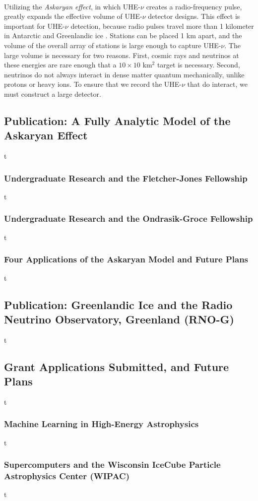 \documentclass[../../../main.tex]{subfiles}
\begin{document}
\\
\vspace{0.25cm}
Utilizing the \textit{Askaryan effect}, in which UHE-$\nu$ creates a radio-frequency pulse, greatly expands the effective volume of UHE-$\nu$ detector designs.  This effect is important for UHE-$\nu$ detection, because radio pulses travel more than 1 kilometer in Antarctic and Greenlandic ice \cite{10.3189/2015jog14j214} \cite{10.3189/2015jog15j057} \cite{10.1002/2015rs005849} \cite{10.1016/j.astropartphys.2011.11.010}.  Stations can be placed 1 km apart, and the volume of the overall array of stations is large enough to capture UHE-$\nu$.  The large volume is necessary for two reasons.  First, cosmic rays and neutrinos at these energies are rare enough that a $10 \times 10$ km$^2$ target is necessary.  Second, neutrinos do not always interact in dense matter quantum mechanically, unlike protons or heavy ions.  To ensure that we record the UHE-$\nu$ that do interact, we must construct a large detector.

\subsection{Publication: A Fully Analytic Model of the Askaryan Effect}
t
\subsubsection{Undergraduate Research and the Fletcher-Jones Fellowship}
t
\subsubsection{Undergraduate Research and the Ondrasik-Groce Fellowship}
t
\subsubsection{Four Applications of the Askaryan Model and Future Plans}
t
\subsection{Publication: Greenlandic Ice and the Radio Neutrino Observatory, Greenland (RNO-G)}
t
\subsection{Grant Applications Submitted, and Future Plans}
t
\subsubsection{Machine Learning in High-Energy Astrophysics}
t
\subsubsection{Supercomputers and the Wisconsin IceCube Particle Astrophysics Center (WIPAC)}
t
\end{document}
